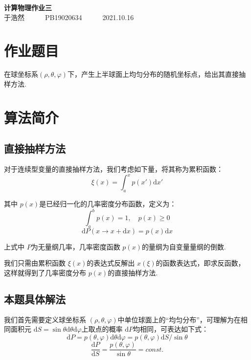 \documentclass[12pt,a4paper,utf8]{ctexart}
\begin{document}
\begin{center}
    {\LARGE\textbf{计算物理作业三}}\\
    \textrm{于浩然}~~~~~~\textrm{PB19020634}~~~~~~\textrm{2021.10.16}
\end{center}
\section{作业题目}

在球坐标系$(\rho, \theta,
\varphi)$下，产生上半球面上均匀分布的随机坐标点，给出其直接抽样方法.

\section{算法简介}

\subsection{直接抽样方法}
对于连续型变量的直接抽样方法，我们考虑如下量，将其称为累积函数：
\begin{equation}
    \xi (x) = \int_a ^x p(x') \textrm{d}x'  
\end{equation}

其中 $p(x)$是已经归一化的几率密度分布函数，定义为：
\begin{equation}
    \int _a ^b p(x) = 1, \quad p(x) \geq 0 
\end{equation}
\begin{equation}
    \textrm{d} P(x \rightarrow x + \textrm{d} x) = p(x) \textrm{d} x
\end{equation}

上式中 $P$为无量纲几率，几率密度函数 $p(x)$的量纲为自变量量纲的倒数.

我们只需由累积函数 $\xi (x)$的表达式反解出
$x(\xi)$的函数表达式，即求反函数，这样就得到了几率密度分布 $p(x)$的直接抽样方法.

\subsection{本题具体解法}

我们首先需要定义球坐标系 $(\rho, \theta,
\varphi)$中单位球面上的“均匀分布”，可理解为在相同面积元 $
\textrm{d}S = \sin \theta \textrm{d} \theta \textrm{d} \varphi$上取点的概率 $ \textrm{d}P$均相同，可表达如下式：
\begin{equation}
    \textrm{d} P = p(\theta,\varphi) \textrm{d} \theta \textrm{d}
    \varphi = p(\theta,\varphi) \textrm{d}S / \sin \theta
\end{equation}
\begin{equation}
    \frac{ \textrm{d}P}{ \textrm{d}S} = \frac{p( \theta, \varphi)}{\sin \theta}
    = const.
\end{equation}
\end{document}
